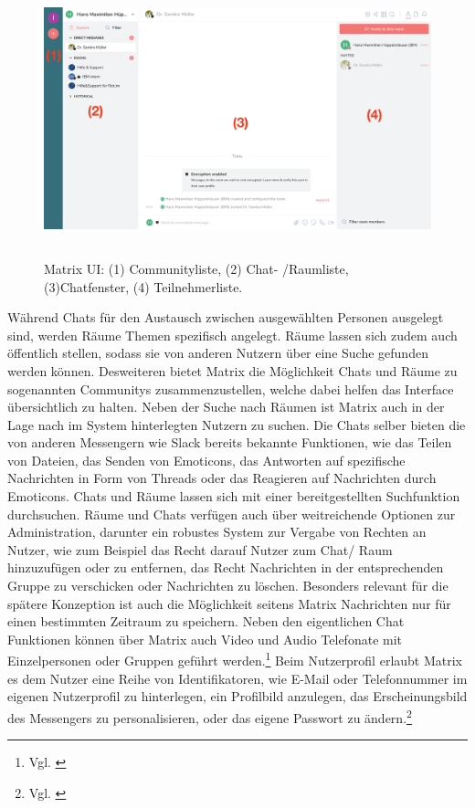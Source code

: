 \begin{figure}[htb]
    \centering
    \includegraphics[height=8cm]{graphics/unknown-3.png}
    \caption[Matrix UI]{Matrix UI: (1) Communityliste, (2) Chat- /Raumliste, (3)Chatfenster, (4) Teilnehmerliste.}
    \label{abb:UI}
\end{figure}

Während Chats für den Austausch zwischen ausgewählten Personen ausgelegt sind, werden Räume Themen spezifisch angelegt. Räume lassen sich zudem auch öffentlich stellen, sodass sie von anderen Nutzern über eine Suche gefunden werden können. Desweiteren bietet Matrix die Möglichkeit Chats und Räume zu sogenannten Communitys zusammenzustellen, welche dabei helfen das Interface übersichtlich zu halten.
Neben der Suche nach Räumen ist Matrix auch in der Lage nach im System hinterlegten Nutzern zu suchen. Die Chats selber bieten die von anderen Messengern wie Slack bereits bekannte Funktionen, wie das Teilen von Dateien, das Senden von Emoticons, das Antworten auf spezifische Nachrichten in Form von Threads oder das Reagieren auf Nachrichten durch Emoticons. Chats und Räume lassen sich mit einer bereitgestellten Suchfunktion durchsuchen. Räume und Chats verfügen auch über weitreichende Optionen zur Administration, darunter ein robustes System zur Vergabe von Rechten an Nutzer, wie zum Beispiel das Recht darauf Nutzer zum Chat/ Raum hinzuzufügen oder zu entfernen, das Recht Nachrichten in der entsprechenden Gruppe zu verschicken oder Nachrichten zu löschen. Besonders relevant für die spätere Konzeption ist auch die Möglichkeit seitens Matrix Nachrichten nur für einen bestimmten Zeitraum zu speichern.
Neben den eigentlichen Chat Funktionen können über Matrix auch Video und Audio Telefonate mit Einzelpersonen oder Gruppen geführt werden.\footnote{Vgl. \cite{Matrix.org2020}} Beim Nutzerprofil erlaubt Matrix es dem Nutzer eine Reihe von Identifikatoren, wie E-Mail oder Telefonnummer im eigenen Nutzerprofil zu hinterlegen, ein Profilbild anzulegen, das Erscheinungsbild des Messengers zu personalisieren, oder das eigene Passwort zu ändern.\footnote{Vgl. \cite{Github2020}}

